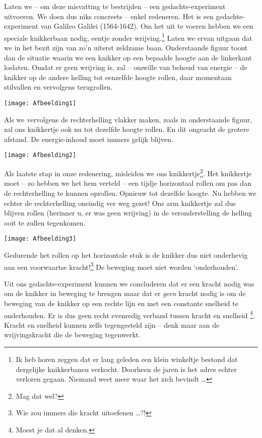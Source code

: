 \documentclass{ximera}
\begin{document}
	Laten we -- om deze misvatting te bestrijden -- een gedachte-experiment uitvoeren. We doen dus niks concreets -- enkel redeneren. Het is een gedachte-experiment van Galileo Galilei (1564-1642). Om het uit te voeren hebben we een speciale knikkerbaan nodig, eentje zonder wrijving.\footnote{Ik heb horen zeggen dat er lang geleden een klein winkeltje bestond dat dergelijke knikkerbanen verkocht. Doorheen de jaren is het adres echter verloren gegaan. Niemand weet meer waar het zich bevindt \ldots} Laten we ervan uitgaan dat we in het bezit zijn van zo'n uiterst zeldzame baan. Onderstaande figuur toont dan de situatie waarin we een knikker op een bepaalde hoogte aan de linkerkant loslaten. Omdat er geen wrijving is, zal -- omwille van behoud van energie -- de knikker op de andere helling tot eenzelfde hoogte rollen, daar momentaan stilvallen en vervolgens terugrollen.
	\begin{image}
	\texttt{[image: Afbeelding1]}
	
	\end{image}
	
	Als we vervolgens de rechterhelling vlakker maken, zoals in onderstaande figuur, zal ons knikkertje ook nu tot dezelfde hoogte rollen. En dit ongeacht de grotere afstand. De energie-inhoud moet immers gelijk blijven.
	\begin{image}
	\texttt{[image: Afbeelding2]}
	\end{image}
	
	Als laatste stap in onze redenering, misleiden we ons knikkertje\footnote{Mag dat wel?}. Het knikkertje moet -- zo hebben we het hem verteld -- een tijdje horizontaal rollen om pas dan de rechterhelling te kunnen oprollen. Opnieuw tot dezelfde hoogte. Nu hebben we echter de rechterhelling oneindig ver weg gezet! Ons arm knikkertje zal dus blijven rollen (herinner u, er was geen wrijving) in de veronderstelling de helling ooit te zullen tegenkomen. 
	\begin{image}
	\texttt{[image: Afbeelding3]}
	\end{image}
	Gedurende het rollen op het horizontale stuk is de knikker dus niet onderhevig aan een voorwaartse kracht!\footnote{Wie zou immers die kracht uitoefenen \ldots?!} De beweging moet niet worden `onderhouden'. 
	
	Uit ons gedachte-experiment kunnen we concluderen dat er een kracht nodig was om de knikker in beweging te brengen maar dat er \emph{geen} kracht nodig is om de beweging van de knikker op een rechte lijn en met een constante snelheid te onderhouden. Er is dus geen recht evenredig verband tussen kracht en snelheid \footnote{Moest je dat al denken.}. Kracht en snelheid kunnen zelfs tegengesteld zijn -- denk maar aan de wrijvingskracht die de beweging tegenwerkt.
	
\end{document}
